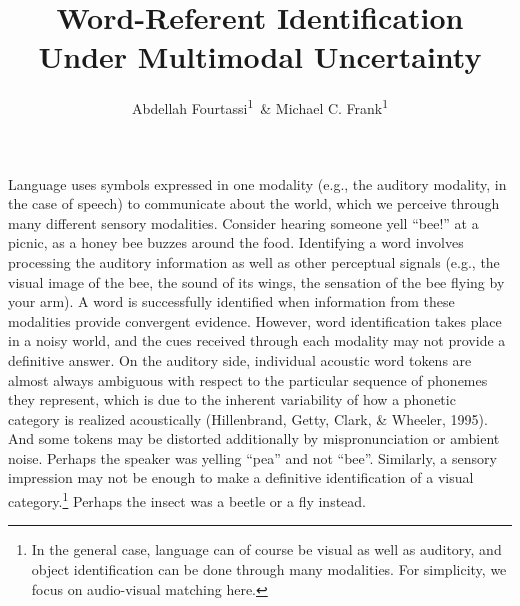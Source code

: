\documentclass[english,man]{apa6}
\title{Word-Referent Identification Under Multimodal Uncertainty}
\author{Abdellah Fourtassi\textsuperscript{1}~\& Michael C. Frank\textsuperscript{1}}
\affiliation{
    \vspace{0.5cm}
          \textsuperscript{1} Department of Psychology, Stanford University  }
\theoremstyle{definition}
\theoremstyle{definition}
\theoremstyle{definition}
\theoremstyle{remark}
\begin{document}
\maketitle

\setcounter{secnumdepth}{0}



Language uses symbols expressed in one modality (e.g., the auditory
modality, in the case of speech) to communicate about the world, which
we perceive through many different sensory modalities. Consider hearing
someone yell \enquote{bee!} at a picnic, as a honey bee buzzes around
the food. Identifying a word involves processing the auditory
information as well as other perceptual signals (e.g., the visual image
of the bee, the sound of its wings, the sensation of the bee flying by
your arm). A word is successfully identified when information from these
modalities provide convergent evidence. However, word identification
takes place in a noisy world, and the cues received through each
modality may not provide a definitive answer. On the auditory side,
individual acoustic word tokens are almost always ambiguous with respect
to the particular sequence of phonemes they represent, which is due to
the inherent variability of how a phonetic category is realized
acoustically (Hillenbrand, Getty, Clark, \& Wheeler, 1995). And some
tokens may be distorted additionally by mispronunciation or ambient
noise. Perhaps the speaker was yelling \enquote{pea} and not
\enquote{bee}. Similarly, a sensory impression may not be enough to make
a definitive identification of a visual
category.\footnote{In the general case, language can of course be visual as well as auditory, and object identification can be done through many modalities. For simplicity, we focus on audio-visual matching here.}
Perhaps the insect was a beetle or a fly instead.
\end{document}
